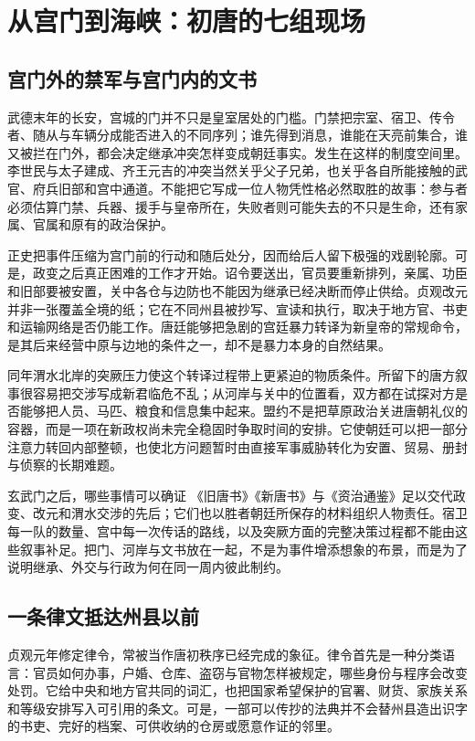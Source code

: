 \section{从宫门到海峡：初唐的七组现场}
\label{sec:early-tang-acceptance-scenes}

\subsection{宫门外的禁军与宫门内的文书}
武德末年的长安，宫城的门并不只是皇室居处的门槛。门禁把宗室、宿卫、传令者、随从与车辆分成能否进入的不同序列；谁先得到消息，谁能在天亮前集合，谁又被拦在门外，都会决定继承冲突怎样变成朝廷事实。发生在这样的制度空间里。李世民与太子建成、齐王元吉的冲突当然关乎父子兄弟，也关乎各自所能接触的武官、府兵旧部和宫中通道。不能把它写成一位人物凭性格必然取胜的故事：参与者必须估算门禁、兵器、援手与皇帝所在，失败者则可能失去的不只是生命，还有家属、官属和原有的政治保护。

正史把事件压缩为宫门前的行动和随后处分，因而给后人留下极强的戏剧轮廓。可是，政变之后真正困难的工作才开始。诏令要送出，官员要重新排列，亲属、功臣和旧部要被安置，关中各仓与边防也不能因为继承已经决断而停止供给。贞观改元并非一张覆盖全境的纸；它在不同州县被抄写、宣读和执行，取决于地方官、书吏和运输网络是否仍能工作。唐廷能够把急剧的宫廷暴力转译为新皇帝的常规命令，是其后来经营中原与边地的条件之一，却不是暴力本身的自然结果。

同年渭水北岸的突厥压力使这个转译过程带上更紧迫的物质条件。所留下的唐方叙事很容易把交涉写成新君临危不乱；从河岸与关中的位置看，双方都在试探对方是否能够把人员、马匹、粮食和信息集中起来。盟约不是把草原政治关进唐朝礼仪的容器，而是一项在新政权尚未完全稳固时争取时间的安排。它使朝廷可以把一部分注意力转回内部整顿，也使北方问题暂时由直接军事威胁转化为安置、贸易、册封与侦察的长期难题。

\begin{sourcenote}{玄武门之后，哪些事情可以确证}
《旧唐书》《新唐书》与《资治通鉴》足以交代政变、改元和渭水交涉的先后；它们也以胜者朝廷所保存的材料组织人物责任。宿卫每一队的数量、宫中每一次传话的路线，以及突厥方面的完整决策过程都不能由这些叙事补足。把门、河岸与文书放在一起，不是为事件增添想象的布景，而是为了说明继承、外交与行政为何在同一周内彼此制约。
\end{sourcenote}

\subsection{一条律文抵达州县以前}
贞观元年修定律令，常被当作唐初秩序已经完成的象征。律令首先是一种分类语言：官员如何办事，户婚、仓库、盗窃与官物怎样被规定，哪些身份与程序会改变处罚。它给中央和地方官共同的词汇，也把国家希望保护的官署、财货、家族关系和等级安排写入可引用的条文。可是，一部可以传抄的法典并不会替州县造出识字的书吏、完好的档案、可供收纳的仓房或愿意作证的邻里。

